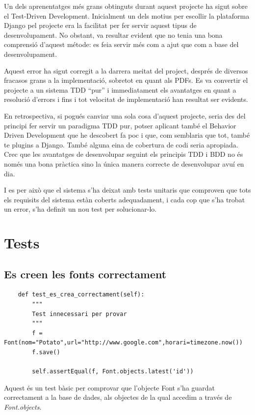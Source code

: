 \documentclass{article}
\begin{document}
Un dels aprenentatges més grans obtinguts durant aquest projecte ha sigut sobre el Test-Driven Development. Inicialment un dels motius per escollir la plataforma Django pel projecte era la facilitat per fer servir aquest tipus de desenvolupament. No obstant, va resultar evident que no tenia una bona comprensió d'aquest métode: es feia servir més com a ajut que com a base del desenvolupament.

Aquest error ha sigut corregit a la darrera meitat del project, després de diversos fracasos grans a la implementació, sobretot en quant als PDFs. Es va convertir el projecte a un sistema TDD ``pur'' i immediatament els avantatges en quant a resolució d'errors i fins i tot velocitat de implementació han resultat ser evidents.

En retrospectiva, si pogués canviar una sola cosa d'aquest projecte, seria des del principi fer servir un paradigma TDD pur, potser aplicant també el Behavior Driven Development que he descobert fa poc i que, com semblaria que tot, també te plugins a Django. També alguna eina de cobertura de codi seria apropiada. Crec que les avantatges de desenvolupar seguint els principis TDD i BDD no és només una bona pràctica sino la única manera correcte de desenvolupar avuí en dia.

I es per això que el sistema s'ha deixat amb tests unitaris que comproven que tots els requisits del sistema estàn coberts adequadament, i cada cop que s'ha trobat un error, s'ha definit un nou test per solucionar-lo.

\newpage

\section{Tests}

\subsection{Es creen les fonts correctament}

\begin{lstlisting}
    def test_es_crea_correctament(self):
        """
        Test innecessari per provar
        """
        f = Font(nom="Potato",url="http://www.google.com",horari=timezone.now())
        f.save()

        self.assertEqual(f, Font.objects.latest('id'))
\end{lstlisting}

Aquest és un test bàsic per comprovar que l'objecte Font s'ha guardat correctament a la base de dades, als objectes de la qual accedim a través de \emph{Font.objects}.
\end{document}
